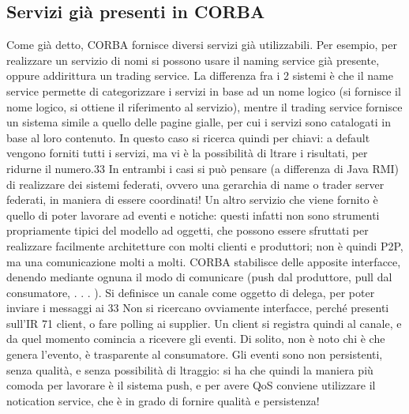 \subsection{Servizi già presenti in CORBA}
Come già detto, CORBA fornisce diversi servizi già utilizzabili.
Per esempio, per realizzare un servizio di nomi si possono usare il naming
service già presente, oppure addirittura un trading service. La differenza fra
i 2 sistemi è che il name service permette di categorizzare i servizi in base ad
un nome logico (si fornisce il nome logico, si ottiene il riferimento al servizio),
mentre il trading service fornisce un sistema simile a quello delle pagine gialle,
per cui i servizi sono catalogati in base al loro contenuto. In questo caso si
ricerca quindi per chiavi: a default vengono forniti tutti i servizi, ma vi è la
possibilità di ltrare i risultati, per ridurne il numero.33
In entrambi i casi si può pensare (a differenza di Java RMI) di realizzare
dei sistemi federati, ovvero una gerarchia di name o trader server federati, in
maniera di essere coordinati!
Un altro servizio che viene fornito è quello di poter lavorare ad eventi e
notiche: questi infatti non sono strumenti propriamente tipici del modello ad
oggetti, che possono essere sfruttati per realizzare facilmente architetture con
molti clienti e produttori; non è quindi P2P, ma una comunicazione molti a
molti.
CORBA stabilisce delle apposite interfacce, denendo mediante ognuna il
modo di comunicare (push dal produttore, pull dal consumatore, . . . ). Si
definisce un canale come oggetto di delega, per poter inviare i messaggi ai
33 Non
si ricercano ovviamente interfacce, perché presenti sull'IR
71
client, o fare polling ai supplier. Un client si registra quindi al canale, e da
quel momento comincia a ricevere gli eventi.
Di solito, non è noto chi è che genera l'evento, è trasparente al consumatore.
Gli eventi sono non persistenti, senza qualità, e senza possibilità di ltraggio: si
ha che quindi la maniera più comoda per lavorare è il sistema push, e per avere
QoS conviene utilizzare il notication service, che è in grado di fornire qualità
e persistenza!